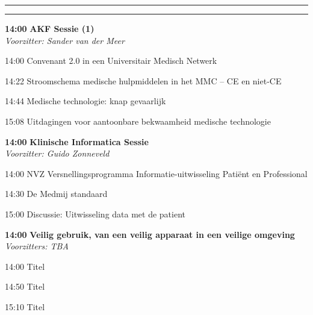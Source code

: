 \documentclass[a4paper,10pt]{report}
\begin{document}
\begin{multicols*}{3}
\vfill\strut

\columnbreak

\hrule \vspace{2mm}
\vspace{2mm}\hrule\strut

\begin{packed_enum}
\item[\textbf{14:00}] \textbf{AKF Sessie (1)}\\\textit{Voorzitter: Sander van der Meer}
\item[14:00] Convenant 2.0 in een Universitair Medisch Netwerk
\item[14:22] Stroomschema medische hulpmiddelen in het MMC -- CE en niet-CE
\item[14:44] Medische technologie: knap gevaarlijk
\item[15:08] Uitdagingen voor aantoonbare bekwaamheid medische technologie
\end{packed_enum} %

\vfill

\begin{packed_enum}
\item[\textbf{14:00}] \textbf{Klinische Informatica Sessie }\\\textit{Voorzitter: Guido Zonneveld}
\item[14:00] NVZ Versnellingsprogramma Informatie-uitwis\-seling Pa\-tiënt en Pro\-fessional 
\item[14:30] De Medmij standaard 
\item[15:00] Discussie: Uitwisseling data met de patient 
\end{packed_enum} %

\vfill

\begin{packed_enum}
\item[\textbf{14:00}] \textbf{Veilig gebruik, van een veilig apparaat in een veilige omgeving}\\\textit{Voorzitters: TBA}
\item[14:00] Titel 
\item[14:50] Titel 
\item[15:10] Titel 
\end{packed_enum} %


\end{multicols*}
\end{document}
